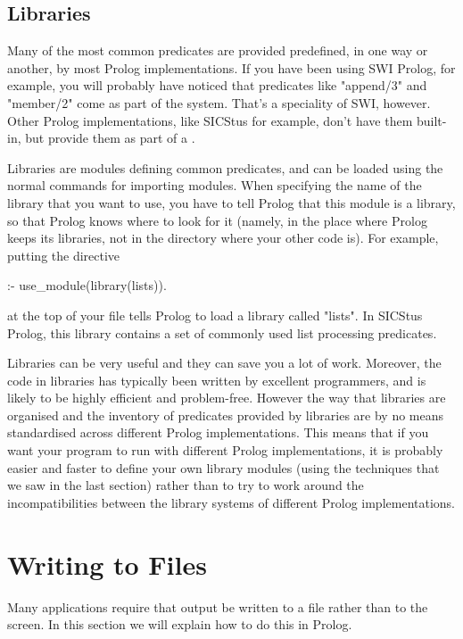 \subsection*{Libraries}\label{SUBSEC.L12.LIBRARIES}

Many of the most common predicates are provided predefined, in one way
or another, by most Prolog implementations.  If you have been using
SWI Prolog, for example, you will probably have noticed that
predicates like "append/3" and "member/2" come as part of the
system. That's a speciality of SWI, however. Other Prolog
implementations, like SICStus for example, don't have them built-in,
but  provide them as part of a .

Libraries are modules defining common predicates, and can be loaded
using the normal commands for importing modules. When specifying the
name of the library that you want to use, you have to tell Prolog that
this module is a library, so that Prolog knows where to look for it
(namely, in the place where Prolog keeps its libraries, not in the
directory where your other code is).
For example, putting the directive
\begin{LPNcodedisplay}
:- use_module(library(lists)).
\end{LPNcodedisplay}
at the top of your file tells Prolog to load a
library called "lists". In SICStus Prolog, this library contains a set of
commonly used list processing predicates.

Libraries can be very useful and they can save you a lot of
work. Moreover, the code in libraries has typically been written by
excellent programmers, and is likely to be highly efficient and
problem-free.  However the way that libraries are organised and the
inventory of predicates provided by libraries are by no means
standardised across different Prolog implementations. This means that
if you want your program to run with different Prolog implementations,
it is probably easier and faster to define your own library modules
(using the techniques that we saw in the last section) rather
than to try to work around the incompatibilities between the library
systems of different Prolog implementations.



\section{Writing to Files}\label{SEC.L12.FILE.WRITING}

Many applications require that output be written to a file rather than
to the screen. In this section we will explain how to do this in
Prolog.

